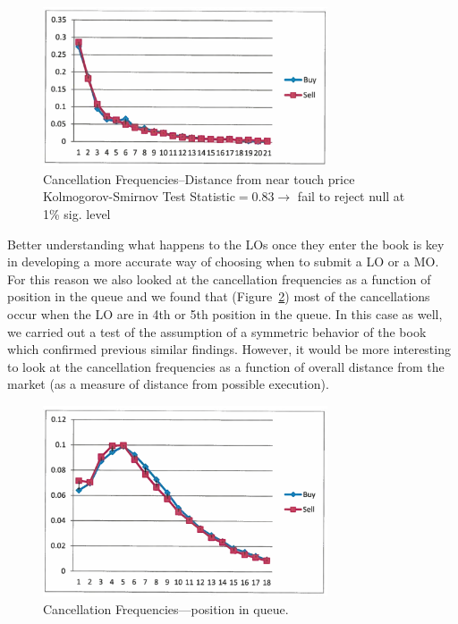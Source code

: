 	\begin{figure}[!ht]
   	\centering
   	\includegraphics[width=0.75\textwidth]{chapters/chapter_el_exch/figures/canfreqnear.png} 
   	\caption{Cancellation Frequencies--Distance from near touch price \\ Kolmogorov-Smirnov Test Statistic$=0.83\to$ fail to reject null at 1\% sig. level \label{fig:canfreqnear}}
	\end{figure}


Better understanding what happens to the LOs once they enter the book is key in developing a more accurate way of choosing when to submit a LO or a MO. For this reason we also looked at the cancellation frequencies as a function of position in the queue and we found that (Figure~\ref{fig:canfreq}) most of the cancellations occur when the LO are in 4th or 5th position in the queue. In this case as well, we carried out a test of the assumption of a symmetric behavior of the book which confirmed previous similar findings. However, it would be more interesting to look at the cancellation frequencies as a function of overall distance from the market (as a measure of distance from possible execution). 
	\begin{figure}[!ht]
   	\centering
   	\includegraphics[width=0.75\textwidth]{chapters/chapter_el_exch/figures/canfreq.png} 
   	\caption{Cancellation Frequencies---position in queue. \label{fig:canfreq}}
	\end{figure}


